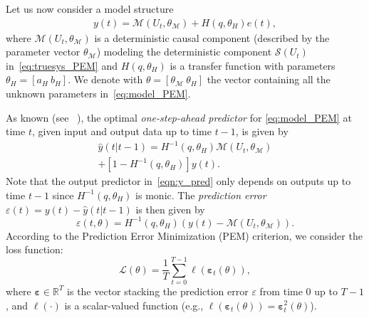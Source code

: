 \documentclass{article}
\newcommand{\nsamp}{T}
\newcommand{\Name}{\emph{dynoNet}}
\begin{document}

Let us now consider a model structure
\begin{align}
\label{eq:model_PEM}
y(t) = \mathcal{M}(U_t, \theta_\mathcal{M}) + H(q, \theta_H) e(t),
\end{align}
where $\mathcal{M}(U_t,\theta_{\mathcal{M}})$ is a deterministic causal component (described by the parameter vector $\theta_{\mathcal{M}}$) modeling the deterministic component  $\mathcal{S}(U_t)$ in~\eqref{eq:truesys_PEM}  
and $H(q, \theta_H)$ is a transfer function with parameters $\theta_H = [a_H \ b_H]$. We denote with $\theta = [\theta_{\mathcal{M}} \ \theta_{H}]$ the vector containing all the unknown parameters in~\eqref{eq:model_PEM}. 

As known (see ~\cite[Ch. 2.3]{ljung:1999system}), the optimal \emph{one-step-ahead predictor} for  \eqref{eq:model_PEM} at time $t$, given input and output data up to time $t-1$, is given by
\begin{multline} \label{eqn:y_pred}
\hat y(t|t-1) = H^{-1}(q, \theta_H) \mathcal{M}(U_t, \theta_\mathcal{M}) \\+ [1\!-\!H^{-1}(q, \theta_H)]y(t).
\end{multline}
{Note that the output predictor in~\eqref{eqn:y_pred}  only depends on outputs up to time $t-1$ since $\!H^{-1}(q, \theta_H)$ is monic.}
The  \emph{prediction error}  $\varepsilon(t) = y(t) - \hat y(t|t-1)$ is then given by
\begin{equation}
\varepsilon(t, \theta) = H^{-1}(q, \theta_H)(y(t) - \mathcal{M}(U_t, \theta_\mathcal{M})).
\end{equation}
According to the Prediction Error Minimization (PEM) criterion, we consider the loss function:
\begin{equation}
\label{eq:loss_PEM}
\mathcal{L}(\theta) = \frac{1}{\nsamp} \sum_{t=0}^{\nsamp -1} \ell(\bm{\varepsilon}_t(\theta)),
\end{equation}
where $\bm{\varepsilon} \in \mathbb{R}^\nsamp$ is the  vector stacking the prediction error $\varepsilon$ from time $0$ up to  $\nsamp - 1$, and 
 $\ell(\cdot)$ is a scalar-valued function (e.g., $\ell(\bm{\varepsilon}_t(\theta))=\bm{\varepsilon}^2_t(\theta)$).
\end{document}
